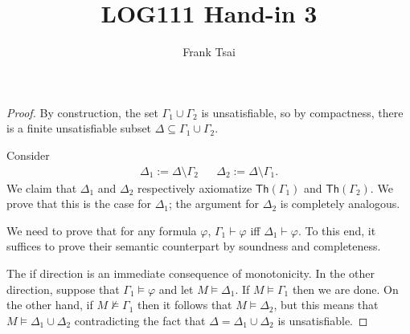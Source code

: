 \documentclass[a4paper]{article}
\title{LOG111 Hand-in 3}
\author{Frank Tsai}
\newcommand{\Th}{{\mathsf{Th}}}
\begin{document}
\maketitle

\section{}
\begin{proof}
  By construction, the set $\Gamma_{1} \cup \Gamma_{2}$ is unsatisfiable, so by compactness, there is a finite unsatisfiable subset $\Delta \subseteq \Gamma_{1} \cup \Gamma_{2}$.
  
  Consider
  \begin{align*}
    \Delta_{1} := \Delta \setminus \Gamma_{2} && \Delta_{2} := \Delta \setminus \Gamma_{1}.
  \end{align*}
  We claim that $\Delta_{1}$ and $\Delta_{2}$ respectively axiomatize $\Th(\Gamma_{1})$ and $\Th(\Gamma_{2})$.
  We prove that this is the case for $\Delta_{1}$; the argument for $\Delta_{2}$ is completely analogous.

  We need to prove that for any formula $\varphi$, $\Gamma_{1} \vdash \varphi$ iff $\Delta_{1} \vdash \varphi$.
  To this end, it suffices to prove their semantic counterpart by soundness and completeness.
  
  The if direction is an immediate consequence of monotonicity.
  In the other direction, suppose that $\Gamma_{1} \vDash \varphi$ and let $M \vDash \Delta_{1}$.
  If $M \vDash \Gamma_{1}$ then we are done.
  On the other hand, if $M \nvDash \Gamma_{1}$ then it follows that $M \vDash \Delta_{2}$, but this means that $M \vDash \Delta_{1} \cup \Delta_{2}$ contradicting the fact that $\Delta = \Delta_{1} \cup \Delta_{2}$ is unsatisfiable.
\end{proof}
\end{document}
